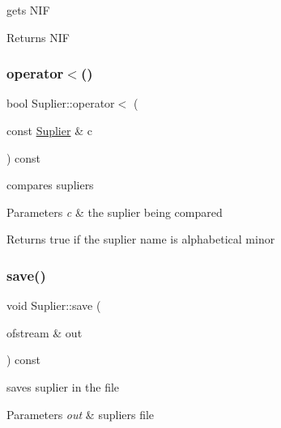 gets N\+IF 

\begin{DoxyReturn}{Returns}
N\+IF 
\end{DoxyReturn}
\hypertarget{class_suplier_a2c6b3672a740180fc02670efb6fd8872}{}\label{class_suplier_a2c6b3672a740180fc02670efb6fd8872} 
\subsubsection{\texorpdfstring{operator$<$()}{operator<()}}
{\footnotesize\ttfamily bool Suplier\+::operator$<$ (\begin{DoxyParamCaption}\item[{const \hyperlink{class_suplier}{Suplier} \&}]{c }\end{DoxyParamCaption}) const}



compares supliers 


\begin{DoxyParams}{Parameters}
{\em c} & the suplier being compared\\
\hline
\end{DoxyParams}
\begin{DoxyReturn}{Returns}
true if the suplier name is alphabetical minor 
\end{DoxyReturn}
\hypertarget{class_suplier_a91fbf47980aa9c9f3e55d9fcc0320201}{}\label{class_suplier_a91fbf47980aa9c9f3e55d9fcc0320201} 
\subsubsection{\texorpdfstring{save()}{save()}}
{\footnotesize\ttfamily void Suplier\+::save (\begin{DoxyParamCaption}\item[{ofstream \&}]{out }\end{DoxyParamCaption}) const}



saves suplier in the file 


\begin{DoxyParams}{Parameters}
{\em out} & supliers file \\
\hline
\end{DoxyParams}
\hypertarget{class_suplier_a9b99e7cbd4cb78a97cad39ffd6d0a691}{}\label{class_suplier_a9b99e7cbd4cb78a97cad39ffd6d0a691} 
